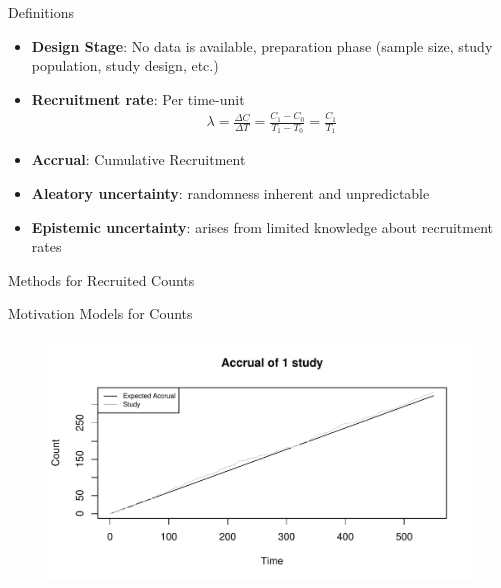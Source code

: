 \documentclass[english]{beamer}\usepackage[]{graphicx}\usepackage[]{xcolor}
\makeatletter
\def\maxwidth{ %
  \ifdim\Gin@nat@width>\linewidth
    \linewidth
  \else
    \Gin@nat@width
  \fi
}
\newenvironment{knitrout}{}{} %
\makeatother
\begin{document}
\begin{frame}{Definitions}

\begin{itemize}[label = ]
\item \textbf{Design Stage}: No data is available, preparation phase (sample size, study population, study design, etc.)
\item \textbf{Recruitment rate}: Per time-unit \citep{piantadosi2024clinical}
\begin{align*}
\lambda = \frac{\Delta C}{\Delta T} = \frac{C_1 - C_0}{T_1 - T_0} = \frac{C_1}{T_1}
\end{align*}

\item \textbf{Accrual}: Cumulative Recruitment
\item \textbf{Aleatory uncertainty}: randomness inherent and unpredictable
\item \textbf{Epistemic uncertainty}: arises from limited knowledge about recruitment rates



\end{itemize}


\end{frame}

\begin{frame}{Methods for Recruited Counts}

\end{frame}

\begin{frame}{Motivation Models for Counts}
\begin{figure}
\begin{knitrout}
\color{fgcolor}
\includegraphics[width=\maxwidth]{figures/figunnamed-chunk-2-1} 
\end{knitrout}

\end{figure}

\end{frame}
\end{document}

